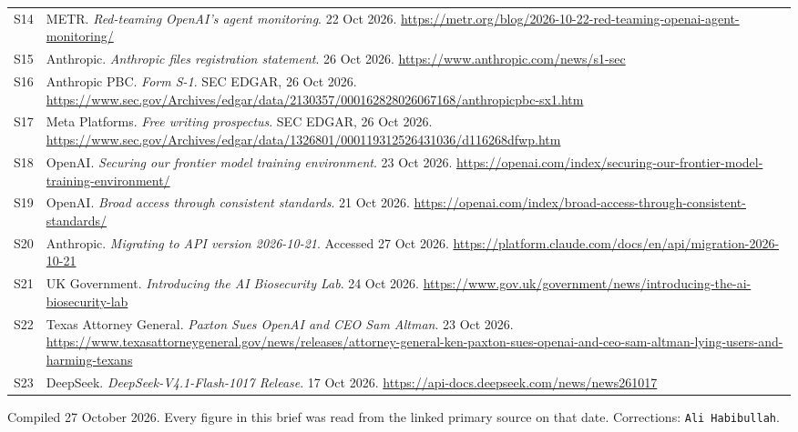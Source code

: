 \documentclass[11pt,a4paper]{article}
\newcommand{\briefdate}{27 October 2026}            %
\newcommand{\briefauthor}{Ali Habibullah}          %
\begin{document}
{\begin{tabularx}{\textwidth}{@{}l X@{}}
S14 & METR. \emph{Red-teaming OpenAI's agent monitoring}. 22 Oct 2026. \url{https://metr.org/blog/2026-10-22-red-teaming-openai-agent-monitoring/} \\
S15 & Anthropic. \emph{Anthropic files registration statement}. 26 Oct 2026. \url{https://www.anthropic.com/news/s1-sec} \\
S16 & Anthropic PBC. \emph{Form S-1}. SEC EDGAR, 26 Oct 2026. \url{https://www.sec.gov/Archives/edgar/data/2130357/000162828026067168/anthropicpbc-sx1.htm} \\
S17 & Meta Platforms. \emph{Free writing prospectus}. SEC EDGAR, 26 Oct 2026. \url{https://www.sec.gov/Archives/edgar/data/1326801/000119312526431036/d116268dfwp.htm} \\
S18 & OpenAI. \emph{Securing our frontier model training environment}. 23 Oct 2026. \url{https://openai.com/index/securing-our-frontier-model-training-environment/} \\
S19 & OpenAI. \emph{Broad access through consistent standards}. 21 Oct 2026. \url{https://openai.com/index/broad-access-through-consistent-standards/} \\
S20 & Anthropic. \emph{Migrating to API version 2026-10-21}. Accessed 27 Oct 2026. \url{https://platform.claude.com/docs/en/api/migration-2026-10-21} \\
S21 & UK Government. \emph{Introducing the AI Biosecurity Lab}. 24 Oct 2026. \url{https://www.gov.uk/government/news/introducing-the-ai-biosecurity-lab} \\
S22 & Texas Attorney General. \emph{Paxton Sues OpenAI and CEO Sam Altman}. 23 Oct 2026. \url{https://www.texasattorneygeneral.gov/news/releases/attorney-general-ken-paxton-sues-openai-and-ceo-sam-altman-lying-users-and-harming-texans} \\
S23 & DeepSeek. \emph{DeepSeek-V4.1-Flash-1017 Release}. 17 Oct 2026. \url{https://api-docs.deepseek.com/news/news261017} \\
\bottomrule
\end{tabularx}}

\vspace{0.8em}
{\footnotesize\color{brandgrey}
Compiled \briefdate. Every figure in this brief was read from the linked primary
source on that date. Corrections: \texttt{\briefauthor}.}
\end{document}

